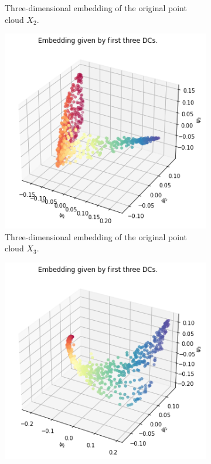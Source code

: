 \begin{figure}[H]
\begin{subfigure}[b]{0.3\textwidth}
    \caption{Three-dimensional embedding of the original point cloud $X_2$.}
\end{subfigure}
\hfill
\begin{subfigure}[b]{0.3\textwidth}
    \includegraphics[width=\textwidth]{figures/topology/X3_embedding.png}
    \caption{Three-dimensional embedding of the original point cloud $X_3$.}
\end{subfigure}
\hfill
\begin{subfigure}[b]{0.3\textwidth}
    \includegraphics[width=\textwidth]{figures/topology/X4_embedding.png}

\end{subfigure}
\end{figure}
